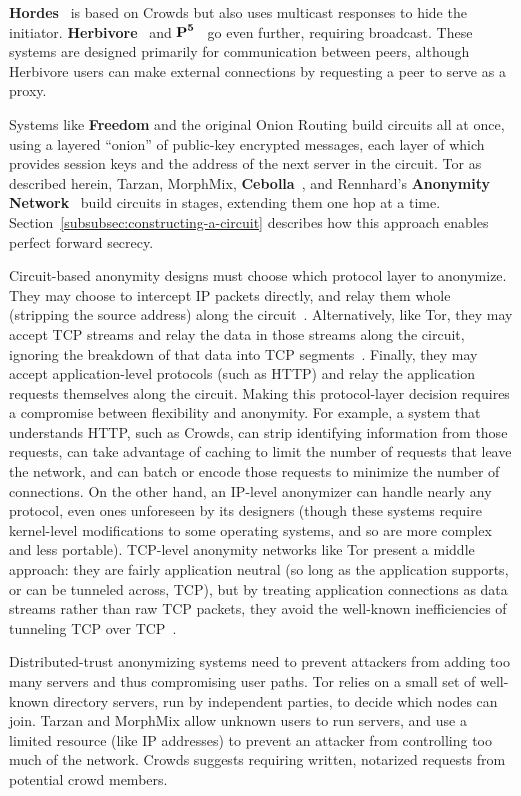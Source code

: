 \documentclass[times,10pt,twocolumn]{article}
\begin{document}
{\bf Hordes}~\cite{hordes-jcs} is based on Crowds but also uses multicast
responses to hide the initiator. {\bf Herbivore}~\cite{herbivore} and
$\mbox{\bf P}^{\mathbf 5}$~\cite{p5} go even further, requiring broadcast.
These systems are designed primarily for communication between peers,
although Herbivore users can make external connections by
requesting a peer to serve as a proxy.

Systems like {\bf Freedom} and the original Onion Routing build circuits
all at once, using a layered ``onion'' of public-key encrypted messages,
each layer of which provides session keys and the address of the
next server in the circuit. Tor as described herein, Tarzan, MorphMix,
{\bf Cebolla}~\cite{cebolla}, and Rennhard's {\bf Anonymity Network}~\cite{anonnet}
build circuits
in stages, extending them one hop at a time.
Section~\ref{subsubsec:constructing-a-circuit} describes how this
approach enables perfect forward secrecy.

Circuit-based anonymity designs must choose which protocol layer
to anonymize. They may choose to intercept IP packets directly, and
relay them whole (stripping the source address) along the
circuit~\cite{freedom2-arch,tarzan:ccs02}.  Alternatively, like
Tor, they may accept TCP streams and relay the data in those streams
along the circuit, ignoring the breakdown of that data into TCP
segments~\cite{morphmix:fc04,anonnet}. Finally, they may accept
application-level protocols (such as HTTP) and relay the application
requests themselves along the circuit.
Making this protocol-layer decision requires a compromise between flexibility
and anonymity.  For example, a system that understands HTTP, such as Crowds,
can strip
identifying information from those requests, can take advantage of caching
to limit the number of requests that leave the network, and can batch
or encode those requests to minimize the number of connections.
On the other hand, an IP-level anonymizer can handle nearly any protocol,
even ones unforeseen by its designers (though these systems require
kernel-level modifications to some operating systems, and so are more
complex and less portable). TCP-level anonymity networks like Tor present
a middle approach: they are fairly application neutral (so long as the
application supports, or can be tunneled across, TCP), but by treating
application connections as data streams rather than raw TCP packets,
they avoid the well-known inefficiencies of tunneling TCP over
TCP~\cite{tcp-over-tcp-is-bad}.

Distributed-trust anonymizing systems need to prevent attackers from
adding too many servers and thus compromising user paths.
Tor relies on a small set of well-known directory servers, run by
independent parties, to decide which nodes can
join. Tarzan and MorphMix allow unknown users to run servers, and use
a limited resource (like IP addresses) to prevent an attacker from
controlling too much of the network.  Crowds suggests requiring
written, notarized requests from potential crowd members.
\end{document}
